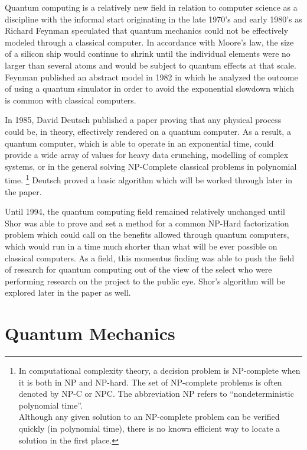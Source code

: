 \documentclass[12pt]{article}
\begin{document}
Quantum computing is a relatively new field in relation to computer science as a discipline with the informal start originating in the late 1970's and early 1980's as Richard Feynman speculated that quantum mechanics could not be effectively modeled through a classical computer. In accordance with Moore's law, the size of a silicon ship would continue to shrink until the individual elements were no larger than several atoms and would be subject to quantum effects at that scale. Feynman published an abstract model in 1982 in which he analyzed the outcome of using a quantum simulator in order to avoid the exponential slowdown which is common with classical computers.\cite{web}\par
In 1985, David Deutsch published a paper proving that any physical process could be, in theory, effectively rendered on a quantum computer. As a result, a quantum computer, which is able to operate in an exponential time, could provide a wide array of values for heavy data crunching, modelling of complex systems, or in the general solving NP-Complete classical problems in polynomial time.
\footnote{In computational complexity theory, a decision problem is NP-complete when it is both in NP and NP-hard. The set of NP-complete problems is often denoted by NP-C or NPC. The abbreviation NP refers to ``nondeterministic polynomial time''.\\Although any given solution to an NP-complete problem can be verified quickly (in polynomial time), there is no known efficient way to locate a solution in the first place.}
Deutsch proved a basic algorithm which will be worked through later in the paper. \par
Until 1994, the quantum computing field remained relatively unchanged until Shor was able to prove and set a method for a common NP-Hard factorization problem which could call on the benefits allowed through quantum computers, which would run in a time much shorter than what will be ever possible on classical computers.\cite{web} As a field, this momentus finding was able to push the field of research for quantum computing out of the view of the select who were performing research on the project to the public eye. Shor's algorithm will be explored later in the paper as well.\par

\section{Quantum Mechanics}
\end{document}

